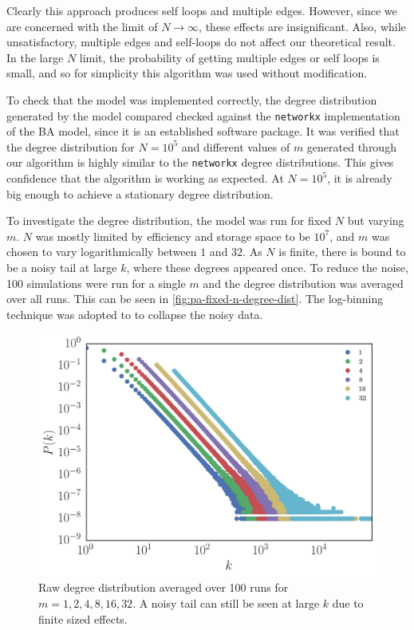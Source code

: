 Clearly this approach produces self loops and multiple edges. However, since we are concerned with the limit of $N \rightarrow \infty$, these effects are insignificant. Also, while unsatisfactory, multiple edges and self-loops do not affect our theoretical result. In the large $N$ limit, the probability of getting multiple edges or self loops is small, and so for simplicity this algorithm was used without modification. 

To check that the model was implemented correctly, the degree distribution generated by the model compared checked against the \texttt{networkx} implementation of the BA model, since it is an established software package. It was verified that the degree distribution for $N = 10^5$ and different values of $m$ generated through our algorithm is highly similar to the \texttt{networkx} degree distributions. This gives confidence that the algorithm is working as expected. At $N = 10^5$, it is already big enough to achieve a stationary degree distribution. 

To investigate the degree distribution, the model was run for fixed $N$ but varying $m$. $N$ was mostly limited by efficiency and storage space to be $10^7$, and $m$ was chosen to vary logarithmically between $1$ and $32$. As $N$ is finite, there is bound to be a noisy tail at large $k$, where these degrees appeared once. To reduce the noise, 100 simulations were run for a single $m$ and the degree distribution was averaged over all runs. This can be seen in \autoref{fig:pa-fixed-n-degree-dist}. The log-binning technique \citep{Christensen:2005} was adopted to to collapse the noisy data. 

\begin{figure}
    \centering
    \includegraphics[height=0.5\linewidth]{img/pa-fixed-n-degree-dist}
    \caption{Raw degree distribution averaged over 100 runs for $m = 1, 2, 4, 8, 16, 32$. A noisy tail can still be seen at large $k$ due to finite sized effects. }
    \label{fig:pa-fixed-n-degree-dist}
\end{figure}

